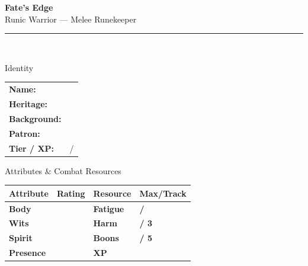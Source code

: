 \documentclass[10pt]{article}
\begin{document}
\begin{center}
    {\Huge\bfseries\sffamily\color{edgered} Fate's Edge}\\[0.2em]
    {\large\sffamily Runic Warrior --- Melee Runekeeper}\\[0.5em]
    \rule{0.5\textwidth}{0.5pt}\\[1em]
\end{center}

\begin{minipage}[t]{0.48\linewidth}
    \begin{charbox}{Identity}
        \begin{tabular}{p{2.5cm} p{5cm}}
            \textbf{Name:} & \underline{\hspace{4cm}} \\
            \textbf{Heritage:} & \underline{\hspace{4cm}} \\
            \textbf{Background:} & \underline{\hspace{4cm}} \\
            \textbf{Patron:} & \underline{\hspace{4cm}} \\
            \textbf{Tier / XP:} & \underline{\hspace{2cm}} / \underline{\hspace{2cm}} \\
        \end{tabular}
    \end{charbox}
    
    \vspace{0.5em}
    
    \begin{charbox}{Attributes \& Combat Resources}
        \begin{tabular}{>{\bfseries}p{2.5cm} >{\bfseries}p{1.5cm} >{\bfseries}p{2.5cm} >{\bfseries}p{1.5cm}}
            \toprule
            \textbf{Attribute} & \textbf{Rating} & \textbf{Resource} & \textbf{Max/Track} \\
            \midrule
            Body & \underline{\hspace{1.5cm}} & Fatigue & \underline{\hspace{1.5cm}} / \underline{\hspace{1.5cm}} \\
            Wits & \underline{\hspace{1.5cm}} & Harm & \underline{\hspace{1.5cm}} / 3 \\
            Spirit & \underline{\hspace{1.5cm}} & Boons & \underline{\hspace{1.5cm}} / 5 \\
            Presence & \underline{\hspace{1.5cm}} & XP & \underline{\hspace{1.5cm}} \\
            \bottomrule
        \end{tabular}
    \end{charbox}
    

\end{minipage}
\end{document}
